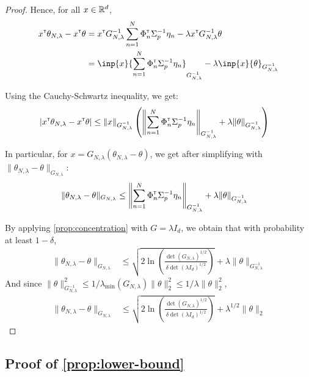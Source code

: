 \documentclass{article}
\begin{document}
\begin{proof}

Hence, for all $x\in\mathbb{R}^d$,
\begin{align*}
    x^\transp\theta_{N,\lambda}  -x^\transp\theta &= x^\transp G_{N, \lambda}^{-1}\sum_{n=1}^N \Phi_n^\transp \Sigma_p^{-1}\eta_n
    - \lambda x^\transp G_{N, \lambda}^{-1}\theta\\
    &= \inp{x}{\sum_{n=1}^N \Phi_n^\transp \Sigma_p^{-1}\eta_n}_{G_{N, \lambda}^{-1}} - \lambda\inp{x}{\theta}_{G_{N, \lambda}^{-1}}
\end{align*}

Using the Cauchy-Schwartz inequality, we get:
\begin{align*}
    |x^{\mathsf{\scriptscriptstyle T}}\theta_{N,\lambda}  -x^{\mathsf{\scriptscriptstyle T}}\theta| &\leq \|x\|_{G_{N, \lambda}^{-1}}\left(\left\|\sum_{n=1}^N \Phi_n^{\mathsf{\scriptscriptstyle T}} \Sigma_p^{-1}\eta_n\right\|_{G_{N, \lambda}^{-1}} + \lambda\|\theta\|_{G_{N, \lambda}^{-1}}\right)
\end{align*}

In particular, for $x = G_{N,\lambda}(\theta_{N,\lambda} - \theta)$, we get after simplifying with $\| \theta_{N,\lambda}  - \theta\|_{G_{N,\lambda}}$:
\begin{align*}
    \| \theta_{N,\lambda}  - \theta\|_{G_{N,\lambda}} &\leq \left\|\sum_{n=1}^N \Phi_n^{\mathsf{\scriptscriptstyle T}} \Sigma_p^{-1}\eta_n\right\|_{G_{N, \lambda}^{-1}} + \lambda\|\theta\|_{G_{N, \lambda}^{-1}}
\end{align*}

By applying \autoref{prop:concentration} with $G=\lambda I_d$, we obtain that with probability at least $1-\delta$,
\begin{align*}
    \| \theta_{N,\lambda}  - \theta\|_{G_{N,\lambda}} &\leq \sqrt{2\ln \left(\frac{\det(G_{N,\lambda})^{1/2}}{\delta\det(\lambda I_d)^{1/2}}\right)}
     + \lambda\|\theta\|_{G_{N, \lambda}^{-1}}
\end{align*}
And since $\|\theta\|_{G_{N, \lambda}^{-1}}^2 \leq 1/\lambda_{\min}(G_{N,\lambda})\|\theta\|_2^2 \leq 1/\lambda \|\theta\|_2^2$,
\begin{align*}
    \| \theta_{N,\lambda}  - \theta\|_{G_{N,\lambda}} &\leq \sqrt{2\ln \left(\frac{\det(G_{N,\lambda})^{1/2}}{\delta\det(\lambda I_d)^{1/2}}\right)}
     + \lambda^{1/2}\|\theta\|_2
\end{align*}
\end{proof}


\subsection{Proof of \autoref{prop:lower-bound}}
\end{document}
